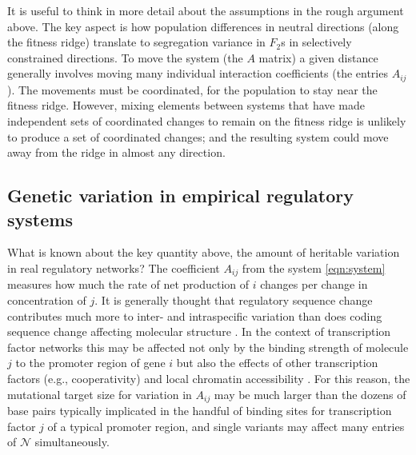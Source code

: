 \documentclass{article}
\newcommand{\1}{\mathbbm{1}}
\newcommand{\allS}{\mathcal{N}}
\begin{document}
It is useful to think in more detail about the assumptions in the rough argument above.
The key aspect is how population differences in neutral directions
(along the fitness ridge)
translate to segregation variance in $F_2$s in selectively constrained directions.
To move the system (the $A$ matrix) a given distance
generally involves moving many individual interaction coefficients (the entries $A_{ij}$).
The movements must be coordinated, for the population to stay near the fitness ridge.
However, mixing elements between systems that have made independent sets of coordinated changes
to remain on the fitness ridge
is unlikely to produce a set of coordinated changes;
and the resulting system could move away from the ridge in almost any direction.


\subsection*{Genetic variation in empirical regulatory systems}

What is known about the key quantity above, the amount of heritable variation in real regulatory networks?
The coefficient $A_{ij}$ from the system \eqref{eqn:system} measures how much the rate of net production of $i$ changes
per change in concentration of $j$.
It is generally thought that regulatory sequence change contributes much more to inter- and intraspecific variation
than does coding sequence change affecting molecular structure \citep{schmidt2010fivevertebrate}.
In the context of transcription factor networks this may be affected 
not only by the binding strength of molecule $j$ to the promoter region of gene $i$
but also the effects of other transcription factors (e.g., cooperativity)
and local chromatin accessibility \citep{stefflova2013cooperativity}.
For this reason, 
the mutational target size for variation in $A_{ij}$ may be much larger than the dozens of base pairs
typically implicated in the handful of binding sites for transcription factor $j$ of a typical promoter region,
and single variants may affect many entries of $\allS$ simultaneously.
\end{document}
